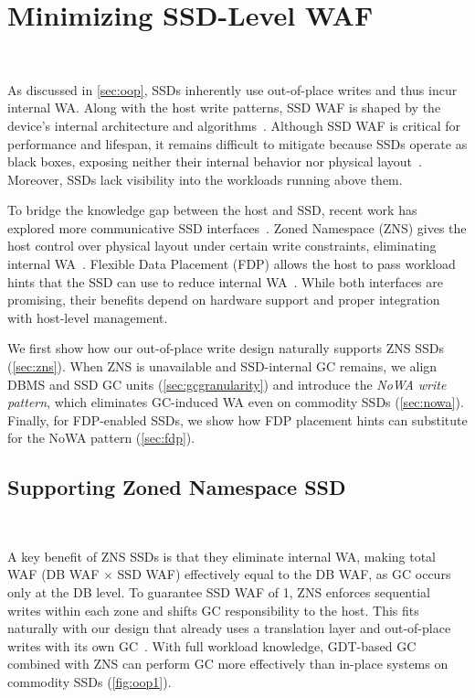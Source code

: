 \section{Minimizing SSD-Level WAF}~\label{sec:ssdwa} %

As discussed in \cref{sec:oop}, SSDs inherently use out-of-place writes and thus incur internal WA.
Along with the host write patterns, SSD WAF is shaped by the device’s internal architecture and algorithms~\cite{DBLP:conf/sigmod/LernerB21,lerner2024principles}.
Although SSD WAF is critical for performance and lifespan, it remains difficult to mitigate because SSDs operate as black boxes, exposing neither their internal behavior nor physical layout~\cite{ssdiq}.
Moreover, SSDs lack visibility into the workloads running above them.

To bridge the knowledge gap between the host and SSD, recent work has explored more communicative SSD interfaces~\cite{DBLP:conf/sigmod/LernerB21}.
Zoned Namespace (ZNS) gives the host control over physical layout under certain write constraints, eliminating internal WA~\cite{DBLP:conf/hotstorage/Maheshwari21}.
Flexible Data Placement (FDP) allows the host to pass workload hints that the SSD can use to reduce internal WA~\cite{SSDhistory}.
While both interfaces are promising, their benefits depend on hardware support and proper integration with host-level management.

We first show how our out-of-place write design naturally supports ZNS SSDs (\cref{sec:zns}).
When ZNS is unavailable and SSD-internal GC remains, 
we align DBMS and SSD GC units (\cref{sec:gcgranularity}) and introduce the \emph{NoWA write pattern}, which eliminates GC-induced WA even on commodity SSDs (\cref{sec:nowa}).
Finally, for FDP-enabled SSDs, we show how FDP placement hints can substitute for the NoWA pattern (\cref{sec:fdp}).

\subsection{Supporting Zoned Namespace SSD}~\label{sec:zns}

A key benefit of ZNS SSDs is that they eliminate internal WA, making total WAF (DB WAF $\times$ SSD WAF) effectively equal to the DB WAF, as GC occurs only at the DB level.  
To guarantee SSD WAF of 1, ZNS enforces sequential writes within each zone and shifts GC responsibility to the host.
This fits naturally with our design that already uses a translation layer and out-of-place writes with its own GC~\cite{DBLP:conf/usenix/BjorlingAHRMGA21}.  
With full workload knowledge, GDT-based GC combined with ZNS can perform GC more effectively than in-place systems on commodity SSDs (\cref{fig:oop1}).

